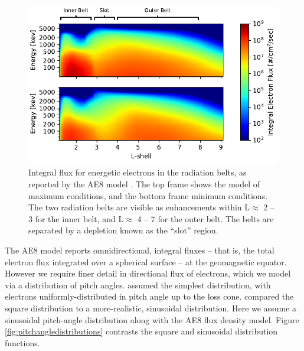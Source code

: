 \begin{figure}
\begin{center}
\includegraphics{figures/AE8_fluxes.pdf}
\caption[AE8 integral flux model]{Integral flux for energetic electrons in the radiation belts, as reported by the AE8 model \citep{Vette1991}. The top frame shows the model of maximum conditions, and the bottom frame minimum conditions. The two radiation belts are visible as enhancements within L$\approx$ 2 -- 3 for the inner belt, and L$\approx$ 4 -- 7 for the outer belt. The belts are separated by a depletion known as the ``slot'' region.}
\label{fig:AE8_model}
\end{center}
\end{figure}

The AE8 model reports omnidirectional, integral fluxes -- that is, the total electron flux integrated over a spherical surface -- at the geomagnetic equator. However we require finer detail in directional flux of electrons, which we model via a distribution of pitch angles. \cite{Lauben1998} assumed the simplest distribution, with electrons uniformly-distributed in pitch angle up to the loss cone. \cite{Bortnik2005} compared the square distribution to a more-realistic, sinusoidal distribution. Here we assume a sinusoidal pitch-angle distribution along with the AE8 flux density model. Figure \ref{fig:pitchangledistributions} contrasts the square and sinusoidal distribution functions.


